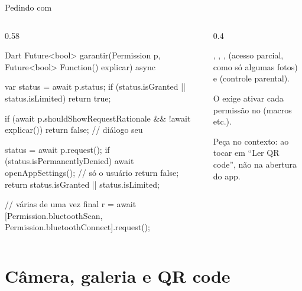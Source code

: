\documentclass[aspectratio=169,10pt]{beamer}
\begin{document}
\begin{frame}[fragile]{Pedindo com }
  \begin{columns}[T]
    \begin{column}{0.58\textwidth}
\begin{codigo}[title=utils/permissoes.dart]{Dart}
Future<bool> garantir(Permission p,
    Future<bool> Function() explicar) async {
  var status = await p.status;
  if (status.isGranted || status.isLimited) return true;

  if (await p.shouldShowRequestRationale &&
      !await explicar()) return false;     // diálogo seu

  status = await p.request();
  if (status.isPermanentlyDenied) {
    await openAppSettings();               // só o usuário
    return false;
  }
  return status.isGranted || status.isLimited;
}

// várias de uma vez
final r = await [Permission.bluetoothScan,
    Permission.bluetoothConnect].request();
\end{codigo}
    \end{column}
    \begin{column}{0.4\textwidth}
      \begin{conceito}[Estados]
        , , ,  (acesso parcial, como só algumas fotos) e  (controle parental).
      \end{conceito}
      \begin{atencao}[iOS]
        O  exige ativar cada permissão no  (macros  etc.).
      \end{atencao}
      \begin{dica}
        Peça no contexto: ao tocar em ``Ler QR code'', não na abertura do app.
      \end{dica}
    \end{column}
  \end{columns}
\end{frame}

\section{Câmera, galeria e QR code}
\end{document}
